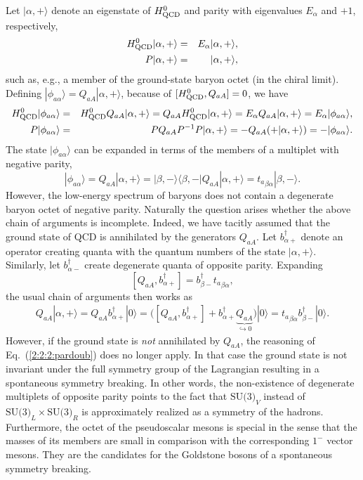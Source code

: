 \documentclass[twoside,12pt]{article}
\begin{document}
   Let $|\alpha,+\rangle$ denote an eigenstate of $H^0_{\rm QCD}$ and parity
with eigenvalues $E_\alpha$ and $+1$, respectively,
\begin{eqnarray*}
H^0_{\rm QCD}|\alpha,+\rangle&=&E_\alpha|\alpha,+\rangle,\\
P|\alpha,+\rangle&=&|\alpha,+\rangle,
\end{eqnarray*}
such as, e.g., a member of the ground-state baryon octet (in the chiral limit).
   Defining $|\phi_{a\alpha}\rangle= Q_{aA}|\alpha,+\rangle$, because of
$[H^0_{\rm QCD},Q_{aA}]=0$, we have
\begin{eqnarray*}
H^0_{\rm QCD}|\phi_{a\alpha}\rangle
&=&H^0_{\rm QCD} Q_{aA}|\alpha,+\rangle
= Q_{aA} H^0_{\rm QCD}|\alpha,+\rangle
= E_\alpha Q_{aA}|\alpha,+\rangle
= E_\alpha |\phi_{a\alpha}\rangle,\\
P|\phi_{a\alpha}\rangle&=& PQ_{aA} P^{-1} P|\alpha,+\rangle=-Q_{aA}(+|\alpha,+\rangle)
=-|\phi_{a\alpha}\rangle.
\end{eqnarray*}
   The state $|\phi_{a\alpha}\rangle$ can be expanded in terms of the members of a
multiplet with negative parity,
\begin{displaymath}
|\phi_{a\alpha}\rangle=Q_{aA}|\alpha,+\rangle=|\beta,-\rangle\langle\beta,-|
Q_{aA}|\alpha,+\rangle={t_a}_{\beta\alpha}|\beta,-\rangle.
\end{displaymath}
   However, the low-energy spectrum of baryons does not contain a degenerate
baryon octet of negative parity.
   Naturally the question arises whether the above chain of arguments is
incomplete.
   Indeed, we have tacitly assumed that the ground state of QCD is annihilated
by the generators $Q_{aA}$.
   Let $b^\dagger_{\alpha+}$ denote an operator creating quanta with the quantum numbers
of the state $|\alpha,+\rangle$.
   Similarly, let $b^\dagger_{\alpha-}$ create degenerate quanta of opposite
parity.
   Expanding
$$
[Q_{aA},b^\dagger_{\alpha+}]= b^\dagger_{\beta-}{t_a}_{\beta\alpha},
$$
the usual chain of arguments then works as
\begin{eqnarray}
\label{2:2:2:pardoub}
Q_{aA}|\alpha,+\rangle=Q_{aA} b^\dagger_{\alpha+}|0\rangle
=\Big([Q_{aA},b^\dagger_{\alpha+}]+b_{\alpha+}^\dagger
\underbrace{Q_{aA}}_{
\mbox{$\hookrightarrow 0$}}\Big)|0\rangle
= {t_a}_{\beta\alpha} b_{\beta-}^\dagger |0\rangle.
\end{eqnarray}
   However, if the ground state is {\em not} annihilated by $Q_{aA}$, the
reasoning of Eq.\ (\ref{2:2:2:pardoub}) does no longer apply.
   In that case the ground state is not invariant under the full
symmetry group of the Lagrangian resulting in a spontaneous
symmetry breaking.
   In other words, the non-existence of degenerate multiplets
of opposite parity points to the fact that $\mbox{SU(3)}_V$ instead
of $\mbox{SU(3)}_L\times\mbox{SU(3)}_R$ is approximately realized
as a symmetry of the hadrons.
   Furthermore, the octet of the pseudoscalar mesons is special in
the sense that the masses of its members are small in comparison with
the corresponding $1^-$ vector mesons.
   They are the candidates for the Goldstone bosons of a spontaneous
symmetry breaking.
\end{document}
